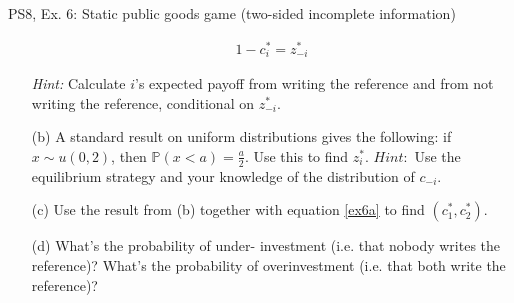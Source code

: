 \begin{frame}{PS8, Ex. 6: Static public goods game (two-sided incomplete information)}
\begin{multicols}{2}
\begin{itemize}
\begin{align}
        1-c_i^*=z_{-i}^*\label{ex6a}
      \end{align}
      \item[] \vspace{-8pt}\textit{Hint:} Calculate $i$'s expected payoff from writing the reference and from not writing the reference, conditional on $z_{-i}^*$.
      \item[(b)] A standard result on uniform distributions gives the following: if $x\sim u(0, 2)$, then $\mathbb{P}(x<a)=\frac{a}{2}$. Use this to find $z_i^*$. $Hint:$ Use the equilibrium strategy and your knowledge of the distribution of $c_{-i}$.
      \item[(c)] Use the result from (b) together with equation \eqref{ex6a} to find $(c_1^* , c_2^*)$.
      \item[(d)] What’s the probability of under- investment (i.e. that nobody writes the reference)? What’s the probability of overinvestment (i.e. that both write the reference)?
    \end{itemize}
    \vfill\null
  \end{multicols}
\end{frame}


